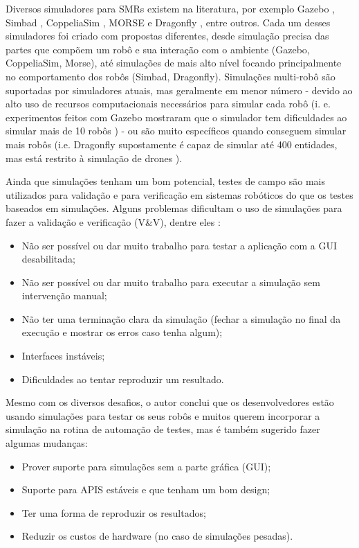 Diversos simuladores para SMRs existem na literatura, por exemplo Gazebo \cite{koenig2004gazebo}, Simbad \cite{hugues2006simbad}, CoppeliaSim \cite{rohmer2013coopeliasim}, MORSE \cite{echeverria2011morse} e Dragonfly \cite{maia2019dragonfly}, entre outros. Cada um desses simuladores foi criado com propostas diferentes, desde simulação precisa das partes que compõem um robô e sua interação com o ambiente (Gazebo, CoppeliaSim, Morse), até simulações de mais alto nível focando principalmente no comportamento dos robôs (Simbad, Dragonfly). Simulações multi-robô são suportadas por simuladores atuais, mas geralmente em menor número - devido ao alto uso de recursos computacionais necessários para simular cada robô (i. e. experimentos feitos com Gazebo mostraram que o simulador tem dificuldades ao simular mais de 10 robôs \cite{noori20173d}) - ou são muito específicos quando conseguem simular mais robôs (i.e. Dragonfly supostamente é capaz de simular até 400 entidades, mas está restrito à simulação de drones \cite{maia2019dragonfly}).

Ainda que simulações tenham um bom potencial, testes de campo são mais utilizados para validação e para verificação em sistemas robóticos do que os testes baseados em simulações. Alguns problemas dificultam o uso de simulações para fazer a validação e verificação (V\&V), dentre eles \cite{robotSimulation}:
\begin{itemize}
    \item Não ser possível ou dar muito trabalho para testar a aplicação com a GUI desabilitada;
    \item Não ser possível ou dar muito trabalho para executar a simulação sem intervenção manual;
    \item Não ter uma terminação clara da simulação (fechar a simulação no final da execução e mostrar os erros caso tenha algum);
    \item Interfaces instáveis;
    \item Dificuldades ao tentar reproduzir um resultado.
\end{itemize}

Mesmo com os diversos desafios, o autor \cite{robotSimulation} conclui que os desenvolvedores estão usando simulações para testar os seus robôs e muitos querem incorporar a simulação na rotina de automação de testes, mas é também sugerido fazer algumas mudanças:
\begin{itemize}
    \item Prover suporte para simulações sem a parte gráfica (GUI);
    \item Suporte para APIS estáveis e que tenham um bom design;
    \item Ter uma forma de reproduzir os resultados;
    \item Reduzir os custos de hardware (no caso de simulações pesadas).
\end{itemize}

